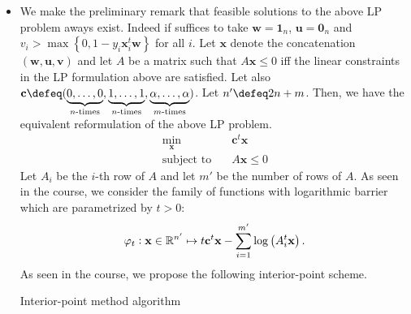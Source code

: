 \documentclass{article}
\begin{document}
\begin{itemize}
       \item We make the preliminary remark that
           feasible solutions to the above LP
           problem aways exist. Indeed
           if suffices to take $\mathbf{w} = \mathbf{1}_{n}$,
           $\mathbf{u} = \mathbf{0}_{n}$ and
           $v_{i} > \max\left\{0, 1 - y_{i}\mathbf{x}_{i}^{t}\mathbf{w}\right\}$ 
           for all $i$.
           Let $\mathbf{x}$ denote the concatenation
           $\left(\mathbf{w}, \mathbf{u}, \mathbf{v}\right)$ and 
           let $A$ be a matrix such that $A\mathbf{x} \leq 0$
           iff the linear constraints in the LP formulation
           above are satisfied. Let also
           $\mathbf{c} \defeq (
           \underbrace{0, \ldots, 0}_{\text{$n$-times}},
           \underbrace{1, \ldots, 1}_{\text{$n$-times}},
           \underbrace{\alpha, \ldots, \alpha}_{\text{$m$-times}})$.
           Let $n' \defeq 2n + m$. Then,
           we have the equivalent reformulation
           of the above LP problem.
           \begin{align*}
               \min_{\mathbf{x}} \quad & \mathbf{c}^{t}\mathbf{x} \\
               \text{subject to} \quad & A \mathbf{x} \leq 0 
           \end{align*}
           Let $A_{i}$ be the $i$-th row of
           $A$ and let $m'$ be the number of
           rows of $A$.
           As seen in the course, we consider
           the family of functions with
           logarithmic barrier which 
           are parametrized by $t > 0$:
           \begin{equation*}
               \varphi_{t} \vcentcolon \mathbf{x} \in \mathbb{R}^{n'}
               \mapsto t \mathbf{c}^{t}\mathbf{x}
               - \sum_{i = 1}^{m'} \log \left(A_{i}^{t}\mathbf{x}\right).
           \end{equation*}
           As seen in the course, we propose
           the following interior-point scheme.
           \begin{algorithm}
               \label{algo}
               \caption{Interior-point method algorithm}
               

           \end{algorithm}
           

\end{itemize}
\end{document}
